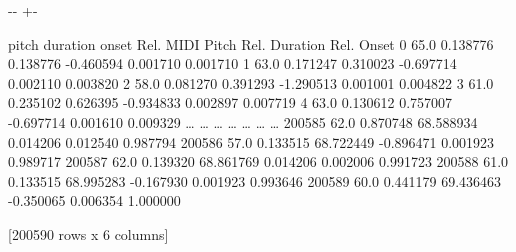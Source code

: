\documentclass[letterpaper,10pt,english]{sphinxmanual}
\newlength\nbsphinxcodecellspacing
\begin{document}
{

\kern-\sphinxverbatimsmallskipamount\kern-\baselineskip
\kern+\FrameHeightAdjust\kern-\fboxrule
\vspace{\nbsphinxcodecellspacing}

\begin{sphinxVerbatim}[commandchars=\\\{\}]
\llap{\color{nbsphinxout}[43]:\,\hspace{\fboxrule}\hspace{\fboxsep}}        pitch  duration      onset  Rel. MIDI Pitch  Rel. Duration  Rel. Onset
0        65.0  0.138776   0.138776        -0.460594       0.001710    0.001710
1        63.0  0.171247   0.310023        -0.697714       0.002110    0.003820
2        58.0  0.081270   0.391293        -1.290513       0.001001    0.004822
3        61.0  0.235102   0.626395        -0.934833       0.002897    0.007719
4        63.0  0.130612   0.757007        -0.697714       0.001610    0.009329
{\ldots}       {\ldots}       {\ldots}        {\ldots}              {\ldots}            {\ldots}         {\ldots}
200585   62.0  0.870748  68.588934         0.014206       0.012540    0.987794
200586   57.0  0.133515  68.722449        -0.896471       0.001923    0.989717
200587   62.0  0.139320  68.861769         0.014206       0.002006    0.991723
200588   61.0  0.133515  68.995283        -0.167930       0.001923    0.993646
200589   60.0  0.441179  69.436463        -0.350065       0.006354    1.000000

[200590 rows x 6 columns]
\end{sphinxVerbatim}
}

{
\begin{sphinxVerbatim}[commandchars=\\\{\}]
\llap{\color{nbsphinxin}[62]:\,\hspace{\fboxrule}\hspace{\fboxsep}}\PYG{p}{[}\PYG{p}{]}
\end{sphinxVerbatim}
}
\end{document}
